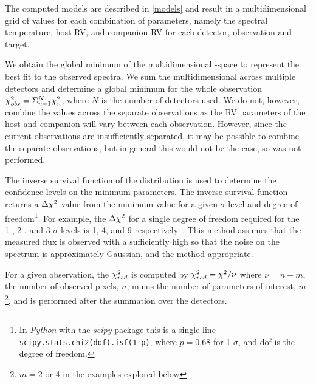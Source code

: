 The computed models are described in \cref{models} and result in a multidimensional grid of \textchisquared{} values for each combination of parameters, namely the spectral temperature, host {RV}, and companion {RV} for each detector, observation and target.

We obtain the global minimum of the multidimensional \textchisquared-space to represent the best fit to the observed spectra.
We sum the multidimensional \textchisquared{} across multiple detectors and determine a global minimum \textchisquared{} for the whole observation \({\chi}^{2}_{obs} = \Sigma^{N}_{n=1} {\chi}^{2}_n\), where \(N\) is the number of detectors used.
We do not, however, combine the \textchisquared{} values across the separate observations as the {RV} parameters of the host and companion will vary between each observation.
However, since the current observations are insufficiently separated, it may be possible to combine the separate observations; but in general this would not be the case, so was not performed.

The inverse survival function of the \textchisquared{} distribution is used to determine the confidence levels on the minimum \textchisquared{} parameters.
The inverse survival function returns a \(\Delta{\chi}^{2}\) value from the minimum \textchisquared{} value for a given $\sigma$ level and degree of freedom\footnote{In \emph{Python} with the \emph{scipy} package this is a single line \texttt{scipy.stats.chi2{(dof)}.isf{(1-p)}}, where \(p = 0.68\) for 1-\(\sigma\), and dof is the degree of freedom.}.
For example, the \(\Delta {\chi}^{2}\) for a single degree of freedom required for the 1-, 2-, and 3-\(\sigma\) levels is 1, 4, and 9 respectively~\citep{bevington_data_2003}.
This method assumes that the measured flux is observed with a \snr{} sufficiently high so that the noise on the spectrum is approximately Gaussian, and the \textchisquared{} method appropriate.

For a given observation, the \({\chi}^{2}_{red}\) is computed by \({\chi}^{2}_{red} = {\chi}^{2} / \nu\) where \(\nu = n - m\), the number of observed pixels, \(n\), minus the number of parameters of interest, \(m\)\footnote{\(m=2\) or 4 in the examples explored below}, and is performed after the summation over the detectors.




